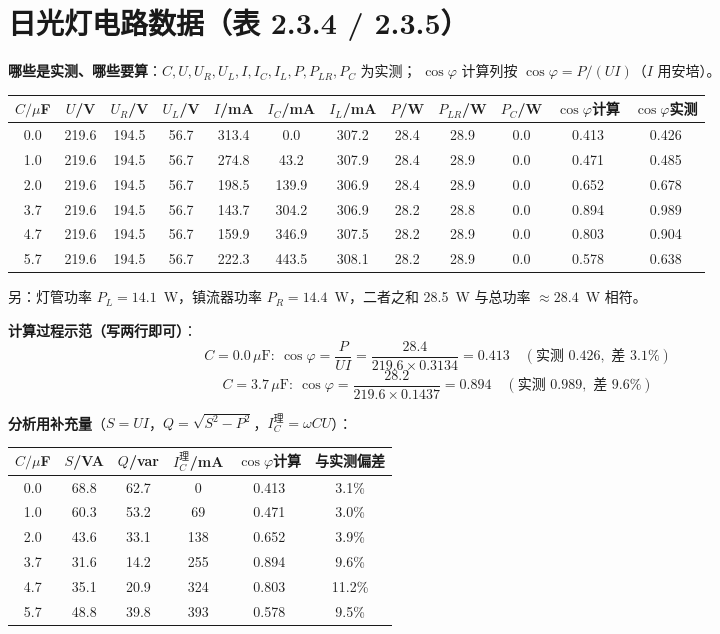 \documentclass[UTF8,a4paper,10.5pt]{ctexart}
\begin{document}
\section{日光灯电路数据（表 2.3.4 / 2.3.5）}
\textbf{哪些是实测、哪些要算}：$C,U,U_R,U_L,I,I_C,I_L,P,P_{LR},P_C$ 为实测；
$\cos\varphi$ 计算列按 $\cos\varphi=P/(UI)$（$I$ 用安培）。

\begin{center}
\scriptsize\setlength{\tabcolsep}{2.2pt}
\begin{tabular}{@{}c*{11}{c}@{}}
\toprule
$C/\mu$F & $U$/V & $U_R$/V & $U_L$/V & $I$/mA & $I_C$/mA & $I_L$/mA & $P$/W & $P_{LR}$/W & $P_C$/W & $\cos\varphi$计算 & $\cos\varphi$实测\\
\midrule
0.0 & 219.6 & 194.5 & 56.7 & 313.4 & 0.0 & 307.2 & 28.4 & 28.9 & 0.0 & 0.413 & 0.426 \\
1.0 & 219.6 & 194.5 & 56.7 & 274.8 & 43.2 & 307.9 & 28.4 & 28.9 & 0.0 & 0.471 & 0.485 \\
2.0 & 219.6 & 194.5 & 56.7 & 198.5 & 139.9 & 306.9 & 28.4 & 28.9 & 0.0 & 0.652 & 0.678 \\
3.7 & 219.6 & 194.5 & 56.7 & 143.7 & 304.2 & 306.9 & 28.2 & 28.8 & 0.0 & 0.894 & 0.989 \\
4.7 & 219.6 & 194.5 & 56.7 & 159.9 & 346.9 & 307.5 & 28.2 & 28.9 & 0.0 & 0.803 & 0.904 \\
5.7 & 219.6 & 194.5 & 56.7 & 222.3 & 443.5 & 308.1 & 28.2 & 28.9 & 0.0 & 0.578 & 0.638 \\
\bottomrule
\end{tabular}
\end{center}
{\scriptsize 另：灯管功率 $P_L=14.1$~W，镇流器功率 $P_R=14.4$~W，二者之和 28.5~W 与总功率 $\approx28.4$~W 相符。}

\noindent\textbf{计算过程示范（写两行即可）}：
\[
C=0.0\,\mu\text{F}:\ \cos\varphi=\frac{P}{UI}=\frac{28.4}{219.6\times0.3134}=0.413
\quad(\text{实测 }0.426,\text{ 差 }3.1\%)
\]
\[
C=3.7\,\mu\text{F}:\ \cos\varphi=\frac{28.2}{219.6\times0.1437}=0.894
\quad(\text{实测 }0.989,\text{ 差 }9.6\%)
\]

\noindent\textbf{分析用补充量}（$S=UI$，$Q=\sqrt{S^2-P^2}$，$I_C^{\text{理}}=\omega CU$）：
\begin{center}
\scriptsize\setlength{\tabcolsep}{4pt}
\begin{tabular}{@{}cccccc@{}}
\toprule
$C/\mu$F & $S$/VA & $Q$/var & $I_C^{\text{理}}$/mA & $\cos\varphi$计算 & 与实测偏差\\
\midrule
0.0 & 68.8 & 62.7 & 0 & 0.413 & 3.1\% \\
1.0 & 60.3 & 53.2 & 69 & 0.471 & 3.0\% \\
2.0 & 43.6 & 33.1 & 138 & 0.652 & 3.9\% \\
3.7 & 31.6 & 14.2 & 255 & 0.894 & 9.6\% \\
4.7 & 35.1 & 20.9 & 324 & 0.803 & 11.2\% \\
5.7 & 48.8 & 39.8 & 393 & 0.578 & 9.5\% \\
\bottomrule
\end{tabular}
\end{center}
\end{document}
